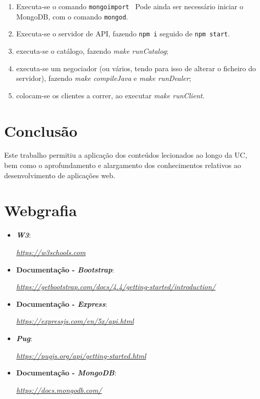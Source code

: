 \documentclass[a4paper]{report}
\begin{document}
	\begin{enumerate}
        \item Executa-se o comando \texttt{mongoimport }
              Pode ainda ser necessário iniciar o MongoDB, com o comando \texttt{mongod}.

		\item Executa-se o servidor de API, fazendo \texttt{npm i} seguido de \texttt{npm start}.
		
		\item executa-se o catálogo, fazendo \textit{make runCatalog};
	
		\item executa-se um negociador (ou vários, tendo para isso de alterar o ficheiro do servidor), fazendo \textit{make compileJava} e \textit{make runDealer};
	
		\item colocam-se os clientes a correr, ao executar \textit{make runClient}.
	\end{enumerate}

\chapter{Conclusão}
Este trabalho permitiu a aplicação dos conteúdos lecionados ao longo da UC, bem como o aprofundamento e alargamento dos conhecimentos relativos ao desenvolvimento de aplicações web.


\chapter{Webgrafia}
	\begin{itemize}
		\item \textbf{\textit{W3}}:
		\par \textit{\url{https://w3schools.com}}
        \item \textbf{Documentação - \textit{Bootstrap}}:
		\par \textit{\url{https://getbootstrap.com/docs/4.4/getting-started/introduction/}}
		\item \textbf{Documentação - \textit{Express}}:
		\par \textit{\url{https://expressjs.com/en/5x/api.html}}
        \item \textbf{\textit{Pug}}:
		\par \textit{\url{https://pugjs.org/api/getting-started.html}}
        \item \textbf{Documentação - \textit{MongoDB}}:
		\par \textit{\url{https://docs.mongodb.com/}}
    \end{itemize}
\end{document}
